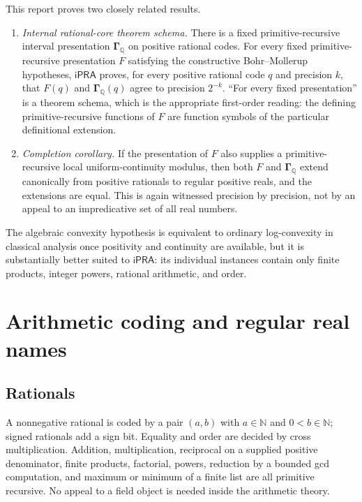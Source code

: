 \documentclass[11pt]{article}
\newcommand{\N}{\mathbb N}
\newcommand{\Q}{\mathbb Q}
\newcommand{\ipra}{\mathsf{iPRA}}
\newcommand{\Gam}{\boldsymbol\Gamma}
\begin{document}
This report proves two closely related results.

\begin{enumerate}[label=\textbf{(\Alph*)},leftmargin=2.5em]
\item \emph{Internal rational-core theorem schema.}  There is a fixed
primitive-recursive interval presentation $\Gam_{\Q}$ on positive rational
codes.  For every fixed primitive-recursive presentation $F$ satisfying the
constructive Bohr--Mollerup hypotheses, $\ipra$ proves, for every positive
rational code $q$ and precision $k$, that $F(q)$ and $\Gam_{\Q}(q)$ agree to
precision $2^{-k}$.  ``For every fixed presentation'' is a theorem schema,
which is the appropriate first-order reading: the defining primitive-recursive
functions of $F$ are function symbols of the particular definitional
extension.

\item \emph{Completion corollary.}  If the presentation of $F$ also supplies
a primitive-recursive local uniform-continuity modulus, then both $F$ and
$\Gam_{\Q}$ extend canonically from positive rationals to regular positive
reals, and the extensions are equal.  This is again witnessed precision by
precision, not by an appeal to an impredicative set of all real numbers.
\end{enumerate}

The algebraic convexity hypothesis is equivalent to ordinary log-convexity in
classical analysis once positivity and continuity are available, but it is
substantially better suited to $\ipra$: its individual instances contain only
finite products, integer powers, rational arithmetic, and order.

\section{Arithmetic coding and regular real names}
\label{sec:coding}

\subsection{Rationals}

A nonnegative rational is coded by a pair $(a,b)$ with $a\in\N$ and
$0<b\in\N$; signed rationals add a sign bit.  Equality and order are decided
by cross multiplication.  Addition, multiplication, reciprocal on a supplied
positive denominator, finite products, factorial, powers, reduction by a
bounded gcd computation, and maximum or minimum of a finite list are all
primitive recursive.  No appeal to a field object is needed inside the
arithmetic theory.
\end{document}
